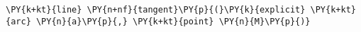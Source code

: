 \begin{Verbatim}[commandchars=\\\{\}]
    \PY{k+kt}{line} \PY{n+nf}{tangent}\PY{p}{(}\PY{k}{explicit} \PY{k+kt}{arc} \PY{n}{a}\PY{p}{,} \PY{k+kt}{point} \PY{n}{M}\PY{p}{)}
\end{Verbatim}
